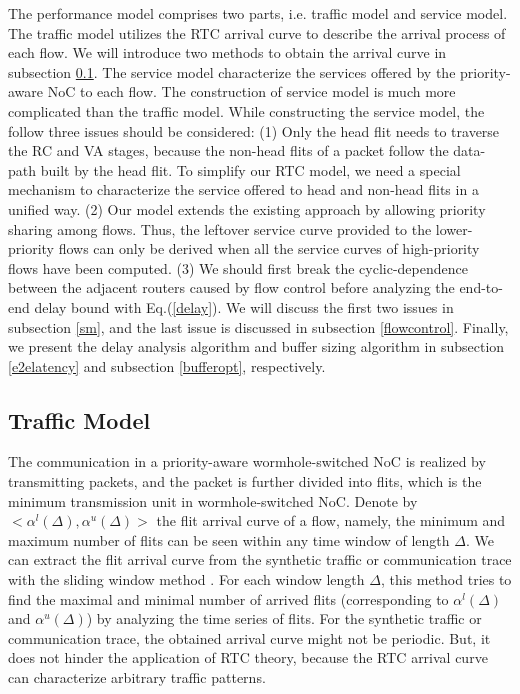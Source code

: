 \documentclass[10pt,journal]{IEEEtran}
\begin{document}
The performance model comprises two parts, i.e. traffic model and service model. The traffic model utilizes the RTC arrival curve to describe the arrival process of each flow. We will introduce two methods to obtain the arrival curve in subsection \ref{traffic}. The service model characterize the services offered by the priority-aware NoC to each flow. The construction of service model is much more complicated than the traffic model. While constructing the service model, the follow three issues should be considered: (1) Only the head flit needs to traverse the RC and VA stages, because the non-head flits of a packet follow the data-path built by the head flit. To simplify our RTC model, we need a special mechanism to characterize the service offered to head and non-head flits in a unified way. (2) Our model extends the existing approach \cite{73}\cite{Qian489900} by allowing priority sharing among flows. Thus, the leftover service curve provided to the lower-priority flows can only be derived when all the service curves of high-priority flows have been computed. (3) We should first break the cyclic-dependence between the adjacent routers caused by flow control before analyzing the end-to-end delay bound with Eq.(\ref{delay}). We will discuss the first two issues in subsection \ref{sm}, and the last issue is discussed in subsection \ref{flowcontrol}. Finally, we present the delay analysis algorithm and buffer sizing algorithm in subsection \ref{e2elatency} and subsection \ref{bufferopt}, respectively.

\subsection{Traffic Model}\label{traffic}
The communication in a priority-aware wormhole-switched NoC is realized by transmitting packets, and the packet is further divided into flits, which is the minimum transmission unit in wormhole-switched NoC. Denote by $<\alpha^l(\Delta),\alpha^u(\Delta)>$ the flit arrival curve of a flow, namely, the minimum and maximum number of flits can be seen within any time window of length $\Delta$. We can extract the flit arrival curve from the synthetic traffic or communication trace with the sliding window method \cite{1253607}. For each window length $\Delta$, this method tries to find the maximal and minimal number of arrived flits (corresponding to $\alpha^l(\Delta)$ and $\alpha^u(\Delta)$) by analyzing the time series of flits. For the synthetic traffic or communication trace, the obtained arrival curve might not be periodic. But, it does not hinder the application of RTC theory, because the RTC arrival curve can characterize arbitrary traffic patterns.
\end{document}
